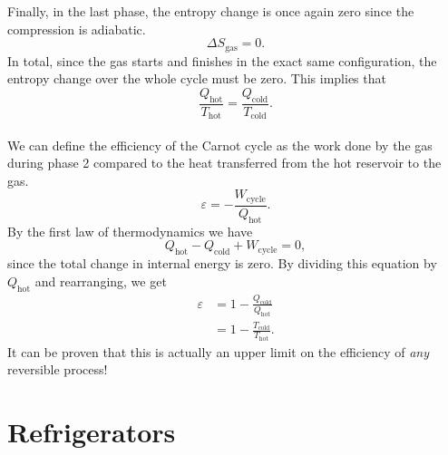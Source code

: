 \documentclass[../thermodynamics.tex]{subfiles}
\begin{document}
        Finally, in the last phase, the entropy change is once again zero since the compression is adiabatic.
        \begin{equation}
            \Delta S_\text{gas}=0.
        \end{equation}
        In total, since the gas starts and finishes in the exact same configuration, the entropy change over the whole cycle must be zero.
        This implies that
        \begin{equation}
            \frac{Q_\text{hot}}{T_\text{hot}}=\frac{Q_\text{cold}}{T_\text{cold}}.
        \end{equation}

        \paragraph{}
        We can define the efficiency of the Carnot cycle as the work done by the gas during phase 2 compared to the heat transferred from the hot reservoir to the gas.
        \begin{equation}
            \varepsilon=-\frac{W_\text{cycle}}{Q_\text{hot}}.
        \end{equation}
        By the first law of thermodynamics we have
        \begin{equation}
            Q_\text{hot}-Q_\text{cold}+W_\text{cycle}=0,
        \end{equation}
        since the total change in internal energy is zero.
        By dividing this equation by $Q_\text{hot}$ and rearranging, we get
        \begin{align}
            \varepsilon&=1-\frac{Q_\text{cold}}{Q_\text{hot}}\\
            &=1-\frac{T_\text{cold}}{T_\text{hot}}.
        \end{align}
        It can be proven that this is actually an upper limit on the efficiency of \textit{any} reversible process!

    \section{Refrigerators}
\end{document}
